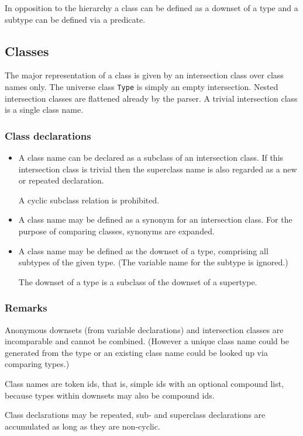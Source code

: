 \documentclass{article}
\begin{document}
In opposition to the hierarchy a class can be defined as a downset of a type
and a subtype can be defined via a predicate.

\subsection{Classes}

The major representation of a class is given by an intersection class over
class names only. The universe class \texttt{Type} is simply an empty
intersection. Nested intersection classes are flattened already by the
parser. A trivial intersection class is a single class name.

\subsubsection*{Class declarations}
\begin{itemize}
\item A class name can be declared as a subclass of an intersection class. If
  this intersection class is trivial then the superclass name is also regarded
  as a new or repeated declaration.
  
  A cyclic subclass relation is prohibited.
\item A class name may be defined as a synonym for an intersection class. For
  the purpose of comparing classes, synonyms are expanded.
\item A class name may be defined as the downset of a type, comprising all
  subtypes of the given type. (The variable name for the subtype is ignored.)
  
  The downset of a type is a subclass of the downset of a
  supertype.
\end{itemize}

\subsubsection*{Remarks}

Anonymous downsets (from variable declarations) and intersection
classes are incomparable and cannot be combined. (However a unique class name
could be generated from the type or an existing class name could be looked up
via comparing types.)

Class names are token ids, that is, simple ids with an optional compound list,
because types within downsets may also be compound ids.

Class declarations may be repeated, sub- and superclass declarations are
accumulated as long as they are non-cyclic.
\end{document}
